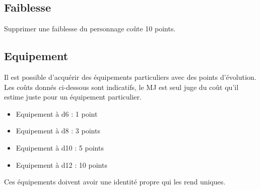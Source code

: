 \begin{multicols}{2}
\subsection{Faiblesse}

Supprimer une faiblesse du personnage coûte 10 points.

\subsection{Equipement}

Il est possible d'acquérir des équipements particuliers avec des points d'évolution. Les coûts donnés ci-dessous sont indicatifs, le MJ est seul juge du coût qu'il estime juste pour un équipement particulier.

\begin{itemize}
\item Equipement à d6 : 1 point
\item Equipement à d8 : 3 points
\item Equipement à d10 : 5 points
\item Equipement à d12 : 10 points
\end{itemize}

Ces équipements doivent avoir une identité propre qui les rend uniques.

\end{multicols}
